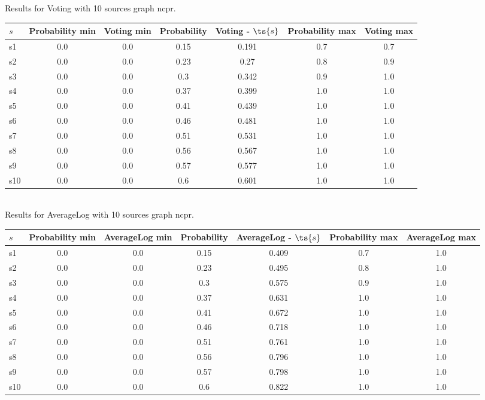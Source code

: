 \documentclass{article}
\begin{document}
\noindent Results for Voting with 10 sources graph ncpr.

\noindent\begin{tabular}{|l|c|c|c|c|c|c|}
\hline
$s$& Probability min & Voting min & Probability & Voting - $\ts{s}$ & Probability max & Voting max\\
\hline
s1 &0.0 & 0.0 & 0.15 & 0.191 & 0.7 & 0.7\\
\hline
s2 &0.0 & 0.0 & 0.23 & 0.27 & 0.8 & 0.9\\
\hline
s3 &0.0 & 0.0 & 0.3 & 0.342 & 0.9 & 1.0\\
\hline
s4 &0.0 & 0.0 & 0.37 & 0.399 & 1.0 & 1.0\\
\hline
s5 &0.0 & 0.0 & 0.41 & 0.439 & 1.0 & 1.0\\
\hline
s6 &0.0 & 0.0 & 0.46 & 0.481 & 1.0 & 1.0\\
\hline
s7 &0.0 & 0.0 & 0.51 & 0.531 & 1.0 & 1.0\\
\hline
s8 &0.0 & 0.0 & 0.56 & 0.567 & 1.0 & 1.0\\
\hline
s9 &0.0 & 0.0 & 0.57 & 0.577 & 1.0 & 1.0\\
\hline
s10 &0.0 & 0.0 & 0.6 & 0.601 & 1.0 & 1.0\\
\hline
\end{tabular}\\

\noindent Results for AverageLog with 10 sources graph ncpr.

\noindent\begin{tabular}{|l|c|c|c|c|c|c|}
\hline
$s$& Probability min & AverageLog min & Probability & AverageLog - $\ts{s}$ & Probability max & AverageLog max\\
\hline
s1 &0.0 & 0.0 & 0.15 & 0.409 & 0.7 & 1.0\\
\hline
s2 &0.0 & 0.0 & 0.23 & 0.495 & 0.8 & 1.0\\
\hline
s3 &0.0 & 0.0 & 0.3 & 0.575 & 0.9 & 1.0\\
\hline
s4 &0.0 & 0.0 & 0.37 & 0.631 & 1.0 & 1.0\\
\hline
s5 &0.0 & 0.0 & 0.41 & 0.672 & 1.0 & 1.0\\
\hline
s6 &0.0 & 0.0 & 0.46 & 0.718 & 1.0 & 1.0\\
\hline
s7 &0.0 & 0.0 & 0.51 & 0.761 & 1.0 & 1.0\\
\hline
s8 &0.0 & 0.0 & 0.56 & 0.796 & 1.0 & 1.0\\
\hline
s9 &0.0 & 0.0 & 0.57 & 0.798 & 1.0 & 1.0\\
\hline
s10 &0.0 & 0.0 & 0.6 & 0.822 & 1.0 & 1.0\\
\hline
\end{tabular}\\
\end{document}
